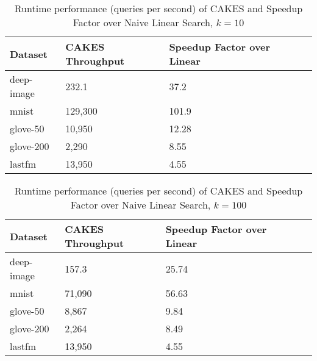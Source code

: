 \begin{table*}[!t]
    \caption{Runtime performance (queries per second) of CAKES and Speedup Factor over Naive Linear Search, $k=10$}
    \label{table:results:ann-alt-10}
    \vskip 0.15in
    \begin{center}
    \begin{small}
    \begin{sc}
    \begin{tabular}{|l|l|l|l|l|}
    \textbf{Dataset} & \textbf{CAKES Throughput} & \textbf{Speedup Factor over Linear} \\
    \hline
    deep-image            & 232.1 & 37.2      \\
    \hline
    mnist                   & 129,300 & 101.9      \\
    \hline
    glove-50              & 10,950 & 12.28      \\
    \hline 
    glove-200              & 2,290 & 8.55     \\
    \hline
    lastfm               & 13,950 & 4.55           \\
    \hline
    \end{tabular}
    \end{sc}
    \end{small}
    \end{center}
    \vskip -0.1in
    \end{table*}


\begin{table*}[!t]
    \caption{Runtime performance (queries per second) of CAKES and Speedup Factor over Naive Linear Search, $k=100$}
    \label{table:results:ann-alt-100}
    \vskip 0.15in
    \begin{center}
    \begin{small}
    \begin{sc}
    \begin{tabular}{|l|l|l|l|l|l|}
    \textbf{Dataset} & \textbf{CAKES Throughput} & \textbf{Speedup Factor over Linear} \\
    \hline
    deep-image             &157.3 &25.74             \\
    \hline
    mnist                 &71,090 &56.63      \\
    \hline
    glove-50               & 8,867 & 9.84      \\
    \hline 
    glove-200              & 2,264 & 8.49    \\
    \hline
    lastfm                 & 13,950     &4.55                               \\
    \hline
    \end{tabular}
    \end{sc}
    \end{small}
    \end{center}
    \vskip -0.1in
    \end{table*}
    